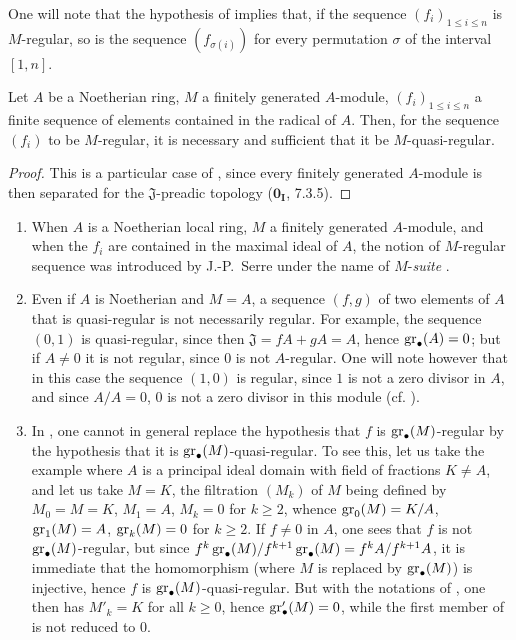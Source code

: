 One will note that the hypothesis of  implies that, if the sequence $(f_i)_{1\leq i\leq n}$ is $M$-regular, so is the sequence $(f_{\sigma(i)})$ for every permutation $\sigma$ of the interval $[1,n]$.

\begin{corollary}[15.1.11]
\label{0.15.1.11}
Let $A$ be a Noetherian ring, $M$ a finitely generated $A$-module, $(f_i)_{1\leq i\leq n}$ a finite sequence of elements contained in the \textup{radical} of $A$.
Then, for the sequence $(f_i)$ to be $M$-regular, it is necessary and sufficient that it be $M$-quasi-regular.
\end{corollary}

\begin{proof}
This is a particular case of , since every finitely generated $A$-module is then separated for the $\mathfrak{J}$-preadic topology ($\mathbf{0_I}$, 7.3.5).
\end{proof}

\begin{remarks}[15.1.12]
\label{0.15.1.12}
\mbox{}
\begin{enumerate}
  \item[(i)] When $A$ is a Noetherian local ring, $M$ a finitely generated $A$-module, and when the $f_i$ are contained in the maximal ideal of $A$, the notion of $M$-regular sequence was introduced by J.-P.~Serre under the name of $M$-\emph{suite} \cite{I-17}.
  \item[(ii)] Even if $A$ is Noetherian and $M=A$, a sequence $(f,g)$ of two elements of $A$ that is quasi-regular is not necessarily regular.
  For example, the sequence $(0,1)$ is quasi-regular, since then $\mathfrak{J}=fA+gA=A$, hence $\operatorname{gr}_\bullet(A)=0$;
  but if $A\neq 0$ it is not regular, since $0$ is not $A$-regular.
  One will note however that in this case the sequence $(1,0)$ is regular, since $1$ is not a zero divisor in $A$, and since $A/A=0$, $0$ is not a zero divisor in this module (cf. ).
  \item[(iii)]
  In , one cannot in general replace the hypothesis that $f$ is $\operatorname{gr}_\bullet(M)$-regular by the hypothesis that it is $\operatorname{gr}_\bullet(M)$-quasi-regular.
  To see this, let us take the example  where $A$ is a principal ideal domain with field of fractions $K\neq A$, and let us take $M=K$, the filtration $(M_k)$ of $M$ being defined by $M_0=M=K$, $M_1=A$, $M_k=0$ for $k\geq 2$, whence $\operatorname{gr}_0(M)=K/A$, $\operatorname{gr}_1(M)=A$, $\operatorname{gr}_k(M)=0$ for $k\geq 2$.
  If $f\neq 0$ in $A$, one sees that $f$ is not $\operatorname{gr}_\bullet(M)$-regular, but since $f^k\operatorname{gr}_\bullet(M)/f^{k+1}\operatorname{gr}_\bullet(M)=f^kA/f^{k+1}A$, it is immediate that the homomorphism  (where $M$ is replaced by $\operatorname{gr}_\bullet(M)$) is injective, hence $f$ is $\operatorname{gr}_\bullet(M)$-quasi-regular.
  But with the notations of , one then has $M'_k=K$ for all $k\geq 0$, hence $\operatorname{gr}'_\bullet(M)=0$, while the first member of  is not reduced to $0$.
\end{enumerate}
\end{remarks}

